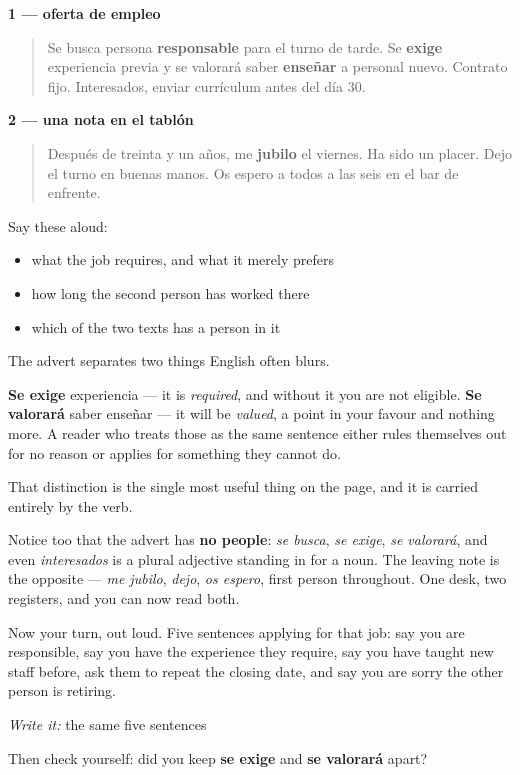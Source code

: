 \textbf{1 — oferta de empleo}

\begin{quote}
Se busca persona \textbf{responsable} para el turno de tarde. Se \textbf{exige} experiencia previa y se valorará saber \textbf{enseñar} a personal nuevo. Contrato fijo. Interesados, enviar currículum antes del día 30.
\end{quote}

\textbf{2 — una nota en el tablón}

\begin{quote}
Después de treinta y un años, me \textbf{jubilo} el viernes. Ha sido un placer. Dejo el turno en buenas manos. Os espero a todos a las seis en el bar de enfrente.
\end{quote}

Say these aloud:

\begin{itemize}
\raggedright
  \item what the job requires, and what it merely prefers
  \item how long the second person has worked there
  \item which of the two texts has a person in it
\end{itemize}

\begin{culture}
The advert separates two things English often blurs.

\textbf{Se exige} experiencia — it is \emph{required}, and without it you are not eligible. \textbf{Se valorará} saber enseñar — it will be \emph{valued}, a point in your favour and nothing more. A reader who treats those as the same sentence either rules themselves out for no reason or applies for something they cannot do.

That distinction is the single most useful thing on the page, and it is carried entirely by the verb.

Notice too that the advert has \textbf{no people}: \emph{se busca}, \emph{se exige}, \emph{se valorará}, and even \emph{interesados} is a plural adjective standing in for a noun. The leaving note is the opposite — \emph{me jubilo}, \emph{dejo}, \emph{os espero}, first person throughout. One desk, two registers, and you can now read both.
\end{culture}

\begin{tcolorbox}[breakable,colback=teal!4,colframe=teal!35!black,title={Before you move on}]
Now your turn, out loud. Five sentences applying for that job: say you are responsible, say you have the experience they require, say you have taught new staff before, ask them to repeat the closing date, and say you are sorry the other person is retiring.

\emph{Write it:} the same five sentences

Then check yourself: did you keep \textbf{se exige} and \textbf{se valorará} apart?
\end{tcolorbox}
